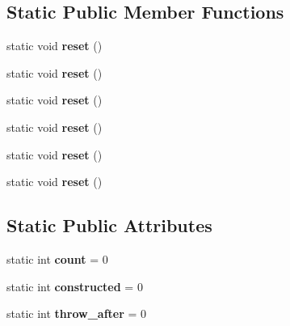 \subsection*{Static Public Member Functions}
\begin{DoxyCompactItemize}
\item 
\mbox{\label{struct_throws_counted_a1bcb8c75ec70c3011129e6090f36649d}} 
static void {\bfseries reset} ()
\item 
\mbox{\label{struct_throws_counted_a1bcb8c75ec70c3011129e6090f36649d}} 
static void {\bfseries reset} ()
\item 
\mbox{\label{struct_throws_counted_a1bcb8c75ec70c3011129e6090f36649d}} 
static void {\bfseries reset} ()
\item 
\mbox{\label{struct_throws_counted_a1bcb8c75ec70c3011129e6090f36649d}} 
static void {\bfseries reset} ()
\item 
\mbox{\label{struct_throws_counted_a1bcb8c75ec70c3011129e6090f36649d}} 
static void {\bfseries reset} ()
\item 
\mbox{\label{struct_throws_counted_a1bcb8c75ec70c3011129e6090f36649d}} 
static void {\bfseries reset} ()
\end{DoxyCompactItemize}
\subsection*{Static Public Attributes}
\begin{DoxyCompactItemize}
\item 
\mbox{\label{struct_throws_counted_a2184fc63c22f03450d163e3454c8d5ea}} 
static int {\bfseries count} = 0
\item 
\mbox{\label{struct_throws_counted_ad9764541cc366ab3fd3660cd17a0f6d1}} 
static int {\bfseries constructed} = 0
\item 
\mbox{\label{struct_throws_counted_a583813ebfed86d7fe1c01dea440ed578}} 
static int {\bfseries throw\+\_\+after} = 0
\end{DoxyCompactItemize}
